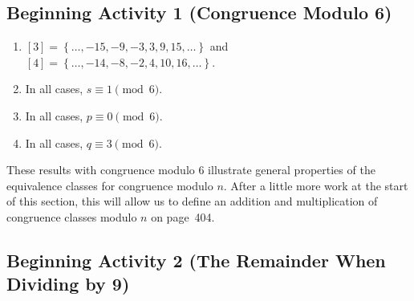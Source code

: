 \documentclass[11pt]{article}
\begin{document}
%
\subsection*{Beginning Activity 1 (Congruence Modulo 6)}
\begin{enumerate}
\item $[3] = \left\{ \ldots, -15, -9, -3, 3, 9, 15, \ldots \right\}$ and 
$[4] = \left\{ \ldots, -14, -8, -2, 4, 10, 16, \ldots \right\}$. 

\item  In all cases, $s \equiv 1 \pmod 6$.
\item In all cases, $p \equiv 0 \pmod 6$.
\item In all cases, $q \equiv 3 \pmod 6$.
\end{enumerate}
These results with congruence modulo 6 illustrate general properties of the equivalence classes for congruence modulo $n$.  After a little more work at the start of this section, this will allow us to define an addition and multiplication of congruence classes modulo $n$ on page~404.
\hbreak

\noindent
\subsection*{Beginning Activity 2 (The Remainder When Dividing by 9)}
\end{document}
